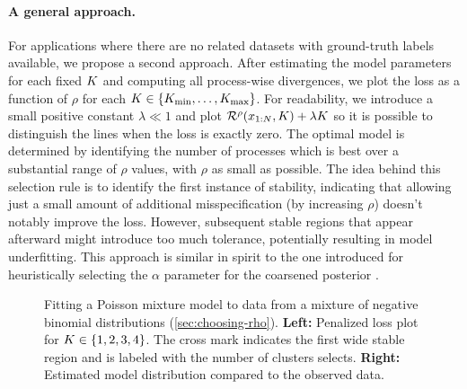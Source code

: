 \paragraph{A general approach.}
For applications where there are no related datasets with ground-truth labels available, we
propose a second approach.  %
After estimating the model parameters for each fixed $K$
and computing all process-wise divergences, we plot the loss as a function of $\rho$ for each $K \in \{K_{\min},\dots,K_{\max}\}$.
For readability, we introduce a small positive constant $\lambda \ll 1$ and plot $\mathcal{R}^{\rho}(x_{1:N}, K) + \lambda K$
so it is possible to distinguish the lines when the loss is exactly zero.
The optimal model is determined by identifying the number of processes which is best over a substantial range of $\rho$ values,
with $\rho$ as small as possible.
The idea behind this selection rule is to identify the first instance of stability, indicating that allowing just a small amount of additional misspecification (by increasing $\rho$) doesn't notably improve the loss.
However, subsequent stable regions that appear afterward might introduce too much tolerance, potentially resulting in model underfitting.
This approach is similar in spirit to the one introduced for heuristically selecting the $\alpha$ parameter for the coarsened posterior \citep{Miller:2019}.


\begin{figure}[tp]
	\centering
	\subfloat{%
		\texttt{[image: penloss-plot-N=20000-trueK=3-legend]}}
	\caption{Fitting a Poisson mixture model to data from a mixture of negative binomial distributions (\cref{sec:choosing-rho}). \textbf{Left:} Penalized loss plot for $K \in \{1,2,3,4\}$. The cross mark indicates the first wide stable region and is labeled with the number of clusters \methodname selects. \textbf{Right:} Estimated model distribution compared to the observed data.}
	\label{fig:poismm}
\end{figure}

